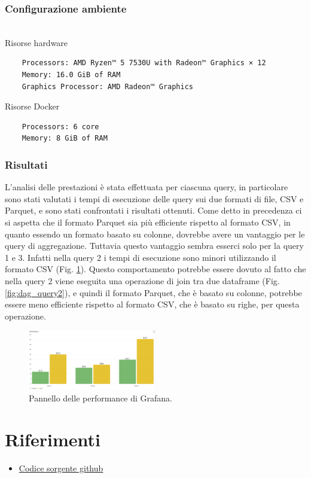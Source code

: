 \documentclass[conference]{IEEEtran}
\begin{document}
\subsubsection{Configurazione ambiente}
 \\
Risorse hardware
\begin{verbatim}
    Processors: AMD Ryzen™ 5 7530U with Radeon™ Graphics × 12
    Memory: 16.0 GiB of RAM
    Graphics Processor: AMD Radeon™ Graphics
\end{verbatim}
Risorse Docker
\begin{verbatim}
    Processors: 6 core
    Memory: 8 GiB of RAM
\end{verbatim}
\subsubsection{Risultati}
L'analisi delle prestazioni è stata effettuata per ciascuna query, in particolare sono stati valutati i tempi di esecuzione delle query sui due formati di file, CSV e Parquet, e sono stati confrontati i risultati ottenuti.
Come detto in precedenza ci si aspetta che il formato Parquet sia più efficiente rispetto al formato CSV, in quanto essendo un formato basato su colonne, dovrebbe avere un vantaggio per le query di aggregazione.
Tuttavia questo vantaggio sembra esserci solo per la query 1 e 3. Infatti nella query 2 i tempi di esecuzione sono minori utilizzando il formato CSV (Fig. \ref{fig:performance_panel}).
Questo comportamento potrebbe essere dovuto al fatto che nella query 2 viene eseguita una operazione di join tra due dataframe (Fig. \ref{fig:dag_query2}), e quindi il formato Parquet, che è basato su colonne, potrebbe essere meno efficiente rispetto al formato CSV, che è basato su righe, per questa operazione.

\begin{figure}[H]
    \centerline{\includegraphics[width=0.5\textwidth]{res/performance_panel.png}}
    \caption{Pannello delle performance di Grafana.}
    \label{fig:performance_panel}
\end{figure}

\section{Riferimenti}
\begin{itemize}
    \item \href{https://github.com/matteo-conti-97/hard_disk_failure_data_processing}{Codice sorgente github}
\end{itemize}
\vspace{12pt}
\end{document}
